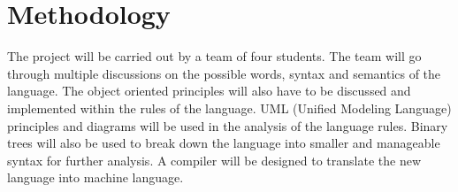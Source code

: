 \documentclass{article}
\begin{document}
\section{Methodology}
The project will be carried out by a team of four students. The team will go through multiple discussions on the possible words, syntax and semantics of the language. The object oriented principles will also have to be discussed and implemented within the rules of the language. UML (Unified Modeling Language) principles and diagrams will be used in the analysis of the language rules. Binary trees will also be used to break down the language into smaller and manageable syntax for further analysis. A compiler will be designed to translate the new language into machine language.



\end{document}
